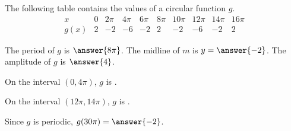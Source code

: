 \documentclass{ximera}
\author{Kenneth Berglund}
\begin{document}
\begin{exercise}
The following table contains the values of a circular function $g$. 
$$
\begin{array}{c|ccccccccc}
x&0&2\pi&4\pi&6\pi&8\pi&10\pi&12\pi&14\pi&16\pi\\
\hline
g(x)&2&-2&-6&-2&2&-2&-6&-2&2
\end{array}
$$

The period of $g$ is $\answer{8\pi}$. The midline of $m$ is $y = \answer{-2}$. The amplitude of $g$ is $\answer{4}$.

On the interval $(0, 4\pi)$, $g$ is .

On the interval $(12\pi, 14\pi)$, $g$ is .

Since $g$ is periodic, $g(30\pi) = \answer{-2}$. 


\end{exercise}
\end{document}
